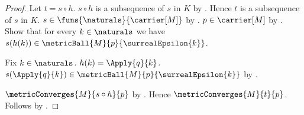 \begin{proof}
    Let $t=s\circ h$.
    $s\circ h$ is a subsequence of $s$ in $K$ by
        .
    Hence $t$ is a subsequence of $s$ in $K$.
    $s\in\funs{\naturals}{\carrier[M]}$ by
        .
    $p\in\carrier[M]$ by .
    Show that for every $k\in\naturals$ we have
        $s(h(k))\in\metricBall{M}{p}{\surrealEpsilon{k}}$.
    \begin{subproof}
        Fix $k\in\naturals$.
        $h(k)=\Apply{q}{k}$.
        $s(\Apply{q}{k})
            \in\metricBall{M}{p}{\surrealEpsilon{k}}$ by
            \auto.
    \end{subproof}
    $\metricConverges{M}{s\circ h}{p}$ by
        .
    Hence $\metricConverges{M}{t}{p}$.
    Follows by \auto.
\end{proof}
